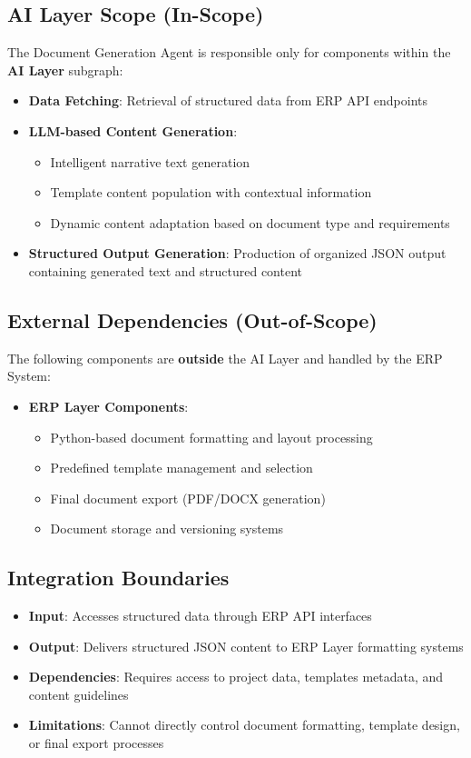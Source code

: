 \documentclass[12pt]{report}
\begin{document}
\subsection{AI Layer Scope (In-Scope)}
The Document Generation Agent is responsible only for components within the \textbf{AI Layer} subgraph:
\begin{itemize}
  \item \textbf{Data Fetching}: Retrieval of structured data from ERP API endpoints
  \item \textbf{LLM-based Content Generation}: 
    \begin{itemize}
      \item Intelligent narrative text generation
      \item Template content population with contextual information
      \item Dynamic content adaptation based on document type and requirements
    \end{itemize}
  \item \textbf{Structured Output Generation}: Production of organized JSON output containing generated text and structured content
\end{itemize}

\subsection{External Dependencies (Out-of-Scope)}
The following components are \textbf{outside} the AI Layer and handled by the ERP System:
\begin{itemize}
  \item \textbf{ERP Layer Components}:
    \begin{itemize}
      \item Python-based document formatting and layout processing
      \item Predefined template management and selection
      \item Final document export (PDF/DOCX generation)
      \item Document storage and versioning systems
    \end{itemize}
\end{itemize}

\subsection{Integration Boundaries}
\begin{itemize}
  \item \textbf{Input}: Accesses structured data through ERP API interfaces
  \item \textbf{Output}: Delivers structured JSON content to ERP Layer formatting systems
  \item \textbf{Dependencies}: Requires access to project data, templates metadata, and content guidelines
  \item \textbf{Limitations}: Cannot directly control document formatting, template design, or final export processes
\end{itemize}
\end{document}
